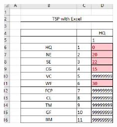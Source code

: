 \documentclass[10pt]{article}
\begin{document}
\includegraphics[max width=\textwidth]{2022_07_05_5945264bba2a5f6ba667g-58(2)}
\end{document}
